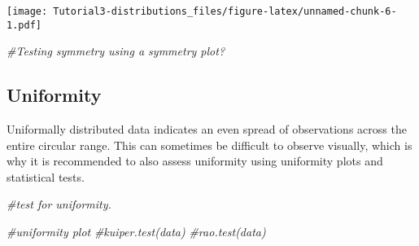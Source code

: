 \documentclass[]{article}
\newenvironment{Shaded}{\begin{snugshade}}{\end{snugshade}}
\newcommand{\CommentTok}[1]{\textcolor[rgb]{0.56,0.35,0.01}{\textit{#1}}}
\begin{document}
\texttt{[image: Tutorial3-distributions\_files/figure-latex/unnamed-chunk-6-1.pdf]}

\begin{Shaded}
\begin{Highlighting}[]
\CommentTok{#Testing symmetry using a symmetry plot?}
\end{Highlighting}
\end{Shaded}

\subsection{Uniformity}\label{uniformity}

Uniformally distributed data indicates an even spread of observations
across the entire circular range. This can sometimes be difficult to
observe visually, which is why it is recommended to also assess
uniformity using uniformity plots and statistical tests.

\begin{Shaded}
\begin{Highlighting}[]
\CommentTok{#test for uniformity.}

\CommentTok{#uniformity plot}
\CommentTok{#kuiper.test(data)}
\CommentTok{#rao.test(data)}
\end{Highlighting}
\end{Shaded}
\end{document}
